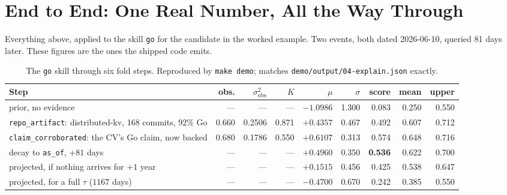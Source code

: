 \documentclass[11pt,a4paper]{article}
\begin{document}
\section{End to End: One Real Number, All the Way Through}
\label{sec:worked}

Everything above, applied to the skill \texttt{go} for the candidate in the
worked example. Two events, both dated 2026-06-10, queried 81 days later.
These figures are the ones the shipped code emits.

\begin{table}[H]
\centering\footnotesize
\begin{tabular}{@{}L{4.1cm}rrrrrrrr@{}}
\toprule
\textbf{Step} & \textbf{obs.} & $\sigma^2_{\text{obs}}$ & $K$ & $\mu$ & $\sigma$ & \textbf{score} & \textbf{mean} & \textbf{upper} \\
\midrule
prior, no evidence & --- & --- & --- & $-1.0986$ & 1.300 & 0.083 & 0.250 & 0.550 \\
\texttt{repo\_artifact}: distributed-kv, 168 commits, 92\% Go
    & 0.660 & 0.2506 & 0.871 & $+0.4357$ & 0.467 & 0.492 & 0.607 & 0.712 \\
\texttt{claim\_corroborated}: the CV's Go claim, now backed
    & 0.680 & 0.1786 & 0.550 & $+0.6107$ & 0.313 & 0.574 & 0.648 & 0.716 \\
decay to \texttt{as\_of}, $+81$ days
    & --- & --- & --- & $+0.4960$ & 0.350 & \textbf{0.536} & 0.622 & 0.700 \\
projected, if nothing arrives for $+1$ year
    & --- & --- & --- & $+0.1515$ & 0.456 & 0.425 & 0.538 & 0.647 \\
projected, for a full $\tau$ ($1167$ days)
    & --- & --- & --- & $-0.4700$ & 0.670 & 0.242 & 0.385 & 0.550 \\
\bottomrule
\end{tabular}
\caption{The \texttt{go} skill through six fold steps. Reproduced by
\texttt{make demo}; matches \texttt{demo/output/04-explain.json} exactly.}
\label{tab:trace}
\end{table}
\end{document}
